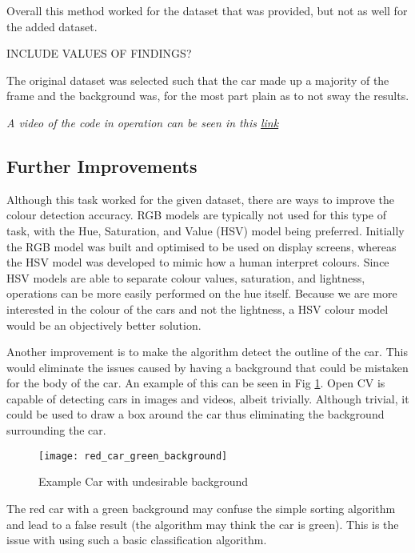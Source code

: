 \documentclass[conference]{IEEEtran}
\begin{document}
Overall this method worked for the dataset that was provided, but not as well for the added dataset. 

INCLUDE VALUES OF FINDINGS?


The original dataset was selected such that the car made up a majority of the frame and the background was, for the most part plain as to not sway the results.

\textit{A video of the code in operation can be seen in this \href{https://github.com/LukeDWaller99/Aint308}{link}}


\subsection{Further Improvements}
Although this task worked for the given dataset, there are ways to improve the colour detection accuracy. RGB models are typically not used for this type of task, with the Hue, Saturation, and Value (HSV) model being preferred. Initially the RGB model was built and optimised to be used on display screens, whereas the HSV model was developed to mimic how a human interpret colours. Since HSV models are able to separate colour values, saturation, and lightness, operations can be more easily performed on the hue itself. Because we are more interested in the colour of the cars and not the lightness, a HSV colour model would be an objectively better solution. \cite{ref:HSV_vs_RGB}

Another improvement is to make the algorithm detect the outline of the car. This would eliminate the issues caused by having a background that could be mistaken for the body of the car. An example of this can be seen in Fig \ref{fig:red_car_green_background}. Open CV is capable of detecting cars in images and videos, albeit trivially. Although trivial, it could be used to draw a box around the car thus eliminating the background surrounding the car. \cite{ref:Vehicle_detection_in_python} 

\begin{figure}
\centerline{\texttt{[image: red\_car\_green\_background]}}
\caption{Example Car with undesirable background}
\label{fig:red_car_green_background}
\end{figure}

The red car with a green background may confuse the simple sorting algorithm and lead to a false result (the algorithm may think the car is green). This is the issue with using such a basic classification algorithm.
\end{document}
